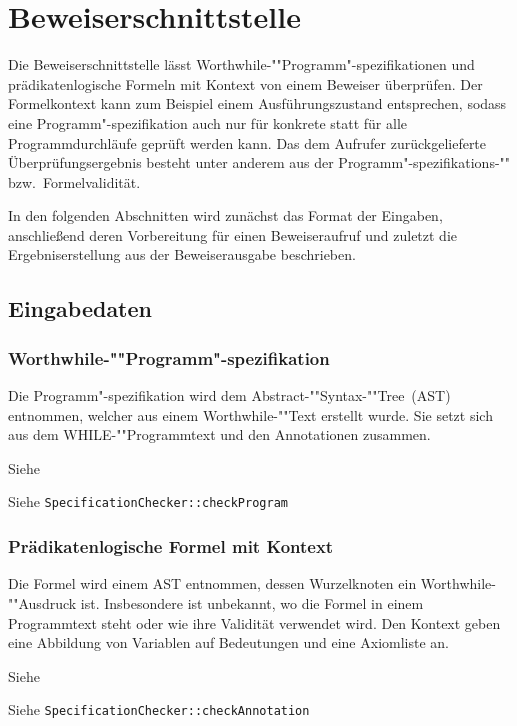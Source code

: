 \section{Beweiserschnittstelle}%

Die Beweiserschnittstelle lässt Worthwhile-""Programm"-spezifikationen
und prädikatenlogische Formeln mit Kontext von einem Beweiser
überprüfen. Der Formelkontext kann zum Beispiel einem
Ausführungszustand entsprechen, sodass eine Programm"-spezifikation
auch nur für konkrete statt für alle Programmdurchläufe geprüft werden
kann. Das dem Aufrufer zurückgelieferte Überprüfungsergebnis besteht
unter anderem aus der Programm"-spezifikations-"" bzw.\
Formelvalidität.

In den folgenden Abschnitten wird zunächst das Format der Eingaben,
anschließend deren Vorbereitung für einen Beweiseraufruf und zuletzt
die Ergebniserstellung aus der Beweiserausgabe beschrieben.%

\subsection{Eingabedaten}%

\subsubsection{Worthwhile-""Programm"-spezifikation}%

Die Programm"-spezifikation wird dem Abstract-""Syntax-""Tree~(AST)
entnommen, welcher aus einem Worthwhile-""Text erstellt wurde. Sie
setzt sich aus dem WHILE-""Programmtext und den Annotationen
zusammen.%

Siehe %

Siehe \texttt{SpecificationChecker::checkProgram}%

\subsubsection{Prädikatenlogische Formel mit Kontext}%

Die Formel wird einem AST entnommen, dessen Wurzelknoten ein
Worthwhile-""Ausdruck ist. Insbesondere ist unbekannt, wo die Formel
in einem Programmtext steht oder wie ihre Validität verwendet wird.
Den Kontext geben eine Abbildung von Variablen auf Bedeutungen
und eine Axiomliste an.%

Siehe %

Siehe \texttt{SpecificationChecker::checkAnnotation}%

